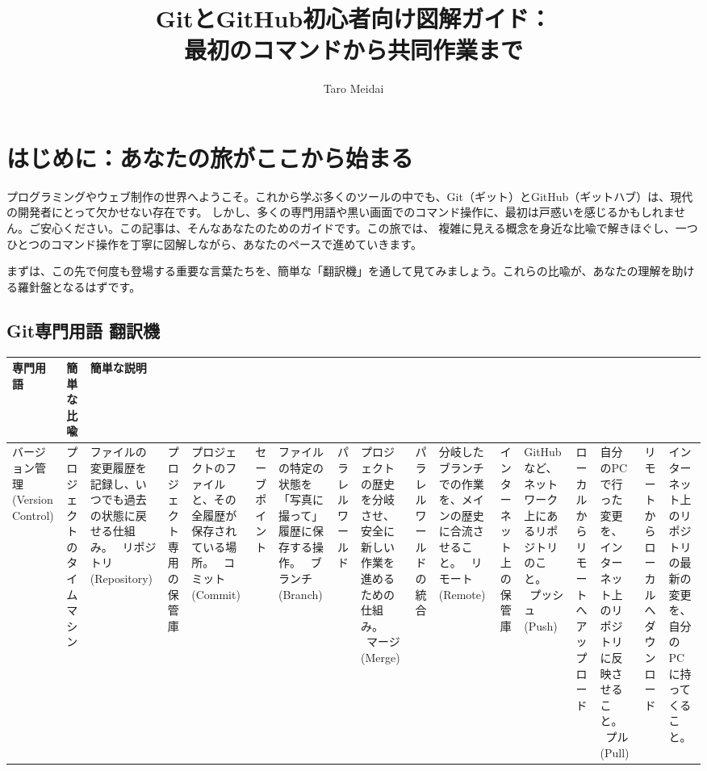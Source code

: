 \documentclass{ltjsarticle}
\begin{document}
\title{GitとGitHub初心者向け図解ガイド：\\
最初のコマンドから共同作業まで}
\author{Taro Meidai}
\maketitle
\tableofcontents
\newpage

\section*{はじめに：あなたの旅がここから始まる}
プログラミングやウェブ制作の世界へようこそ。これから学ぶ多くのツールの中でも、Git（ギット）とGitHub（ギットハブ）は、現代の開発者にとって欠かせない存在です。
しかし、多くの専門用語や黒い画面でのコマンド操作に、最初は戸惑いを感じるかもしれません。ご安心ください。この記事は、そんなあなたのためのガイドです。この旅では、
複雑に見える概念を身近な比喩で解きほぐし、一つひとつのコマンド操作を丁寧に図解しながら、あなたのペースで進めていきます。

まずは、この先で何度も登場する重要な言葉たちを、簡単な「翻訳機」を通して見てみましょう。これらの比喩が、あなたの理解を助ける羅針盤となるはずです。

\subsection*{Git専門用語 翻訳機}
\begin{tabularx}{\textwidth}{|l|l|X|}
\hline
専門用語 & 簡単な比喩 & 簡単な説明 \\ 
\hline
バージョン管理 (Version Control) & プロジェクトのタイムマシン & ファイルの変更履歴を記録し、いつでも過去の状態に戻せる仕組み。 \ 
リポジトリ (Repository) & プロジェクト専用の保管庫 & プロジェクトのファイルと、その全履歴が保存されている場所。 \ 
コミット (Commit) & セーブポイント & ファイルの特定の状態を「写真に撮って」履歴に保存する操作。 \ 
ブランチ (Branch) & パラレルワールド & プロジェクトの歴史を分岐させ、安全に新しい作業を進めるための仕組み。 \ 
マージ (Merge) & パラレルワールドの統合 & 分岐したブランチでの作業を、メインの歴史に合流させること。 \ 
リモート (Remote) & インターネット上の保管庫 & GitHubなど、ネットワーク上にあるリポジトリのこと。 \ 
プッシュ (Push) & ローカルからリモートへアップロード & 自分のPCで行った変更を、インターネット上のリポジトリに反映させること。 \ 
プル (Pull) & リモートからローカルへダウンロード & インターネット上のリポジトリの最新の変更を、自分のPCに持ってくること。 \ 
\hline
\end{tabularx}
\end{document}
